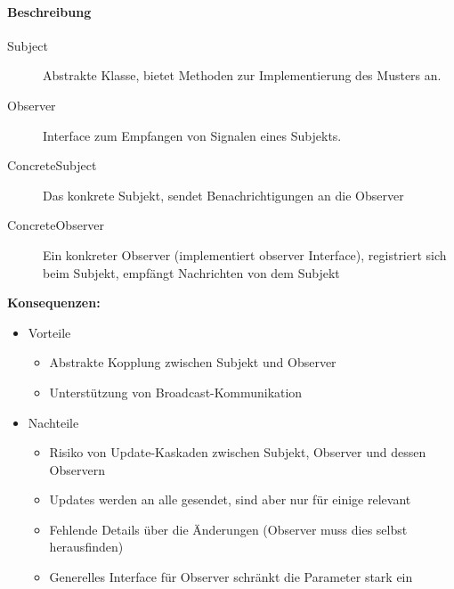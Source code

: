 \documentclass[
    ngerman,
    color=3b,
    summary,
    boxarc,
    main,
]{rubos-tuda-template}
\begin{document}
\paragraph{Beschreibung}\mbox{}\par
\begin{description}
    \item[Subject] Abstrakte Klasse, bietet Methoden zur Implementierung des Musters an.
    \item[Observer] Interface zum Empfangen von Signalen eines Subjekts.
    \item[ConcreteSubject] Das konkrete Subjekt, sendet Benachrichtigungen an die Observer
    \item[ConcreteObserver] Ein konkreter Observer (implementiert observer Interface), registriert sich beim Subjekt, empfängt Nachrichten von dem Subjekt
\end{description}

\clearpage
\textbf{Konsequenzen:}
\begin{itemize}
    \item Vorteile
          \begin{itemize}
              \item Abstrakte Kopplung zwischen Subjekt und Observer
              \item Unterstützung von Broadcast-Kommunikation
          \end{itemize}
    \item Nachteile
          \begin{itemize}
              \item Risiko von Update-Kaskaden zwischen Subjekt, Observer und dessen Observern
              \item Updates werden an alle gesendet, sind aber nur für einige relevant
              \item Fehlende Details über die Änderungen (Observer muss dies selbst herausfinden)
              \item Generelles Interface für Observer schränkt die Parameter stark ein
          \end{itemize}
\end{itemize}
\end{document}
